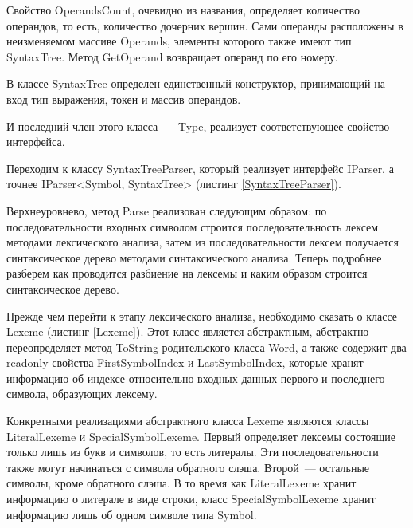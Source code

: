 



Свойство OperandsCount, очевидно из названия, определяет количество операндов, то есть, количество дочерних вершин. Сами операнды расположены в неизменяемом массиве Operands, элементы которого также имеют тип SyntaxTree. Метод GetOperand возвращает операнд по его номеру.

В классе SyntaxTree определен единственный конструктор, принимающий на вход тип выражения, токен и массив операндов.

И последний член этого класса~--- Type, реализует соответствующее свойство интерфейса.

Переходим к классу SyntaxTreeParser, который реализует интерфейс IParser, а точнее IParser<Symbol, SyntaxTree> (листинг \ref{SyntaxTreeParser}).



Верхнеуровнево, метод Parse реализован следующим образом: по последовательности входных символом строится последовательность лексем методами лексического анализа, затем из последовательности лексем получается синтаксическое дерево методами синтаксического анализа. Теперь подробнее разберем как проводится разбиение на лексемы и каким образом строится синтаксическое дерево.

Прежде чем перейти к этапу лексического анализа, необходимо сказать о классе Lexeme (листинг \ref{Lexeme}). Этот класс является абстрактным, абстрактно переопределяет метод ToString родительского класса Word, а также содержит два readonly свойства FirstSymbolIndex и LastSymbolIndex, которые хранят информацию об индексе относительно входных данных первого и последнего символа, образующих лексему.



Конкретными реализациями абстрактного класса Lexeme являются классы LiteralLexeme и SpecialSymbolLexeme. Первый определяет лексемы состоящие только лишь из букв и символов, то есть литералы. Эти последовательности также могут начинаться с символа обратного слэша. Второй~--- остальные символы, кроме обратного слэша. В то время как LiteralLexeme хранит информацию о литерале в виде строки, класс SpecialSymbolLexeme хранит информацию лишь об одном символе типа Symbol. 

